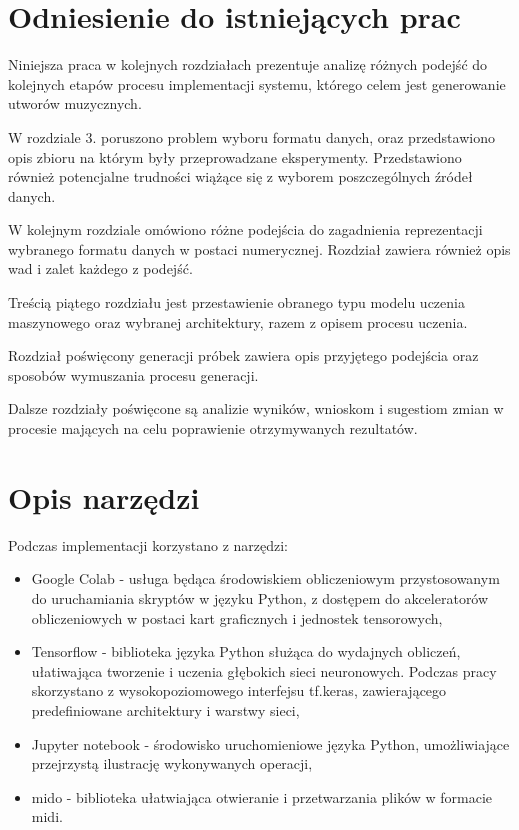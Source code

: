 {  \section{Odniesienie do istniejących prac}
  {
    Niniejsza praca w kolejnych rozdziałach prezentuje analizę różnych podejść do kolejnych etapów
    procesu implementacji systemu, którego celem jest generowanie utworów muzycznych. 

    W rozdziale 3. poruszono problem wyboru formatu danych, oraz przedstawiono opis zbioru na którym
    były przeprowadzane eksperymenty. Przedstawiono również potencjalne trudności wiążące się z wyborem
    poszczególnych źródeł danych.

    W kolejnym rozdziale omówiono różne podejścia do zagadnienia reprezentacji wybranego formatu 
    danych w postaci numerycznej. Rozdział zawiera również opis wad i zalet każdego z podejść.

    Treścią piątego rozdziału jest przestawienie obranego typu modelu uczenia maszynowego oraz 
    wybranej architektury, razem z opisem procesu uczenia.

    Rozdział poświęcony generacji próbek zawiera opis przyjętego podejścia oraz sposobów 
    wymuszania procesu generacji.

    Dalsze rozdziały poświęcone są analizie wyników, wnioskom i sugestiom zmian w procesie mających na celu 
    poprawienie otrzymywanych rezultatów.
  }

  \section{Opis narzędzi}
  {
    Podczas implementacji korzystano z narzędzi:
    \begin{itemize}
      \item Google Colab - usługa będąca środowiskiem obliczeniowym przystosowanym 
      do uruchamiania skryptów w języku Python, z dostępem do akceleratorów obliczeniowych
      w postaci kart graficznych i jednostek tensorowych,
      \item Tensorflow - biblioteka języka Python służąca do wydajnych obliczeń, ułatiwająca 
      tworzenie i uczenia głębokich sieci neuronowych. Podczas pracy skorzystano z 
      wysokopoziomowego interfejsu tf.keras, zawierającego predefiniowane architektury i warstwy sieci,
      \item Jupyter notebook - środowisko uruchomieniowe języka Python, umożliwiające przejrzystą
      ilustrację wykonywanych operacji,
      \item mido - biblioteka ułatwiająca otwieranie i przetwarzania plików w formacie midi.
    \end{itemize}
  }
}
